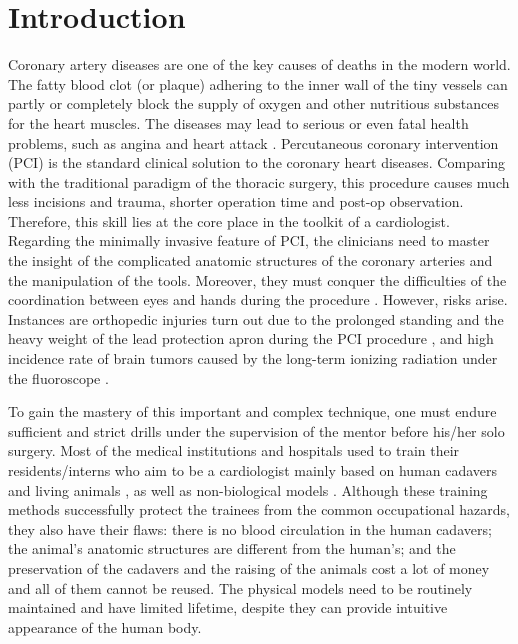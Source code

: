 \section{Introduction}
\label{sec4_0}

Coronary artery diseases are one of the key causes of deaths in the modern world. %
The fatty blood clot (or plaque) adhering to the inner wall of the tiny vessels can partly or completely block the supply of oxygen and other nutritious substances for the heart muscles.
The diseases may lead to serious or even fatal health problems, such as angina and heart attack \cite{OCallaghan2002}.
Percutaneous coronary intervention (PCI) is the standard clinical solution to the coronary heart diseases.
Comparing with the traditional paradigm of the thoracic surgery, this procedure causes much less incisions and trauma, shorter operation time and post-op observation.
Therefore, this skill lies at the core place in the toolkit of a cardiologist.
Regarding the minimally invasive feature of PCI, the clinicians need to master the insight of the complicated anatomic structures of the coronary arteries and the manipulation of the tools.
Moreover, they must conquer the difficulties of the coordination between eyes and hands during the procedure \cite{Li2012CUHK}.
However, risks arise.
Instances are orthopedic injuries turn out due to the prolonged standing and the heavy weight of the lead protection apron during the PCI procedure \cite{Goldstein2004}, and high incidence rate of brain tumors caused by the long-term ionizing radiation under the fluoroscope \cite{Roguin2012}.

To gain the mastery of this important and complex technique, one must endure sufficient and strict drills under the supervision of the mentor before his/her solo surgery.
Most of the medical institutions and hospitals used to train their residents/interns who aim to be a cardiologist mainly based on human cadavers and living animals \cite{Lunderquist1995}, as well as non-biological models \cite{Mori1998}.
Although these training methods successfully protect the trainees from the common occupational hazards, they also have their flaws:
there is no blood circulation in the human cadavers;
the animal's anatomic structures are different from the human's;
and the preservation of the cadavers and the raising of the animals cost a lot of money and all of them cannot be reused.
The physical models need to be routinely maintained and have limited lifetime, despite they can provide intuitive appearance of the human body.

